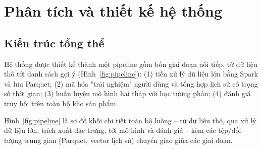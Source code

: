 \chapter{Phân tích và thiết kế hệ thống}
\label{chap:design}

\section{Kiến trúc tổng thể}

Hệ thống được thiết kế thành một pipeline gồm bốn giai đoạn nối tiếp, từ dữ liệu thô
tới danh sách gợi ý (Hình~\ref{fig:pipeline}): (1) tiền xử lý dữ liệu lớn bằng Spark
và lưu Parquet; (2) mã hóa "trải nghiệm" người dùng và tổng hợp lịch sử có trọng số
thời gian; (3) huấn luyện mô hình hai tháp với học tương phản; (4) đánh giá truy hồi
trên toàn bộ kho sản phẩm.

Hình~\ref{fig:pipeline} là sơ đồ khối chi tiết toàn bộ luồng -- từ dữ liệu thô, qua
xử lý dữ liệu lớn, trích xuất đặc trưng, tới mô hình và đánh giá -- kèm các tệp/đối
tượng trung gian (Parquet, vector lịch sử) chuyển giao giữa các giai đoạn.

